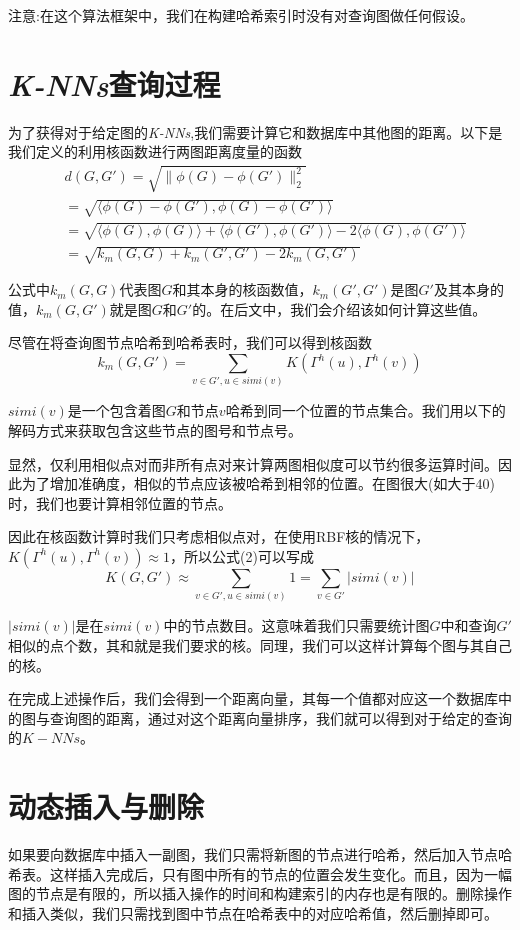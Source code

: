 \documentclass{article}
\begin{document}
注意:在这个算法框架中，我们在构建哈希索引时没有对查询图做任何假设。



\section{\emph{K-NNs}查询过程}
为了获得对于给定图的\emph{K-NNs},我们需要计算它和数据库中其他图的距离。以下是我们定义的利用核函数进行两图距离度量的函数
\begin{equation}
\begin{split}
    &d(G,G')=\sqrt{\|\phi(G)-\phi(G')\|_{2}^{2}}\\
              &=\sqrt{\langle\phi(G)-\phi(G'),\phi(G)-\phi(G')\rangle}\\
              &=\sqrt{\langle\phi(G),\phi(G)\rangle+\langle\phi(G'),\phi(G')\rangle-2\langle\phi(G),\phi(G')\rangle}\\
              &=\sqrt{k_{m}(G,G)+k_{m}(G',G')-2k_{m}(G,G')}
\end{split}
\end{equation}

公式中$k_{m}(G,G)$代表图$G$和其本身的核函数值，$k_{m}(G',G')$是图$G'$及其本身的值，$k_{m}(G,G')$就是图$G$和$G'$的。在后文中，我们会介绍该如何计算这些值。

尽管在将查询图节点哈希到哈希表时，我们可以得到核函数
\begin{equation}
k_{m}(G,G')=\sum_{v\in G',u\in simi(v)}K(\Gamma^{h}(u),\Gamma^{h}(v))
\end{equation}

$simi(v)$是一个包含着图$G$和节点$v$哈希到同一个位置的节点集合。我们用以下的解码方式来获取包含这些节点的图号和节点号。

显然，仅利用相似点对而非所有点对来计算两图相似度可以节约很多运算时间。因此为了增加准确度，相似的节点应该被哈希到相邻的位置。在图很大(如大于40)时，我们也要计算相邻位置的节点。

因此在核函数计算时我们只考虑相似点对，在使用RBF核的情况下，$K(\Gamma^{h}(u),\Gamma^{h}(v))\approx1$，所以公式(2)可以写成
\begin{equation}
    K(G,G')\approx\sum_{v\in G',u\in simi(v)}1=\sum_{v\in G'}|simi(v)| 
\end{equation}

$|simi(v)|$是在$simi(v)$中的节点数目。这意味着我们只需要统计图$G$中和查询$G'$相似的点个数，其和就是我们要求的核。同理，我们可以这样计算每个图与其自己的核。

在完成上述操作后，我们会得到一个距离向量，其每一个值都对应这一个数据库中的图与查询图的距离，通过对这个距离向量排序，我们就可以得到对于给定的查询的$K-NNs$。

\section{动态插入与删除}
如果要向数据库中插入一副图，我们只需将新图的节点进行哈希，然后加入节点哈希表。这样插入完成后，只有图中所有的节点的位置会发生变化。而且，因为一幅图的节点是有限的，所以插入操作的时间和构建索引的内存也是有限的。删除操作和插入类似，我们只需找到图中节点在哈希表中的对应哈希值，然后删掉即可。

\ifx\allfiles\undefined
\renewcommand\refname{参考文献}


\end{document}
